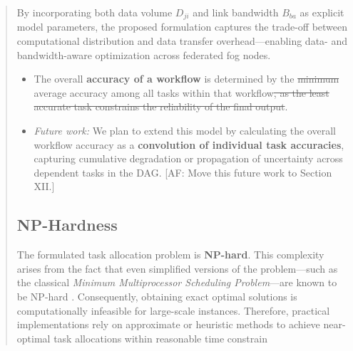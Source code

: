 \documentclass[conference]{IEEEtran}
\newcommand{\anninsert}[2]{{\color{#1}#2}}
\newcommand{\anncomment}[3]{{\color{#1}[#2: #3]}}
\newcommand{\anninsert}[2]{#2}
\newcommand{\anncomment}[3]{}
\newcommand{\AF}[1]{\anncomment{violet}{AF}{#1}}
\newcommand{\af}[1]{\anninsert{violet}{#1}}
\begin{document}
\begin{abstract}
By incorporating both data volume \( D_{ji} \) and link bandwidth \( B_{ba} \) as explicit model parameters, the proposed formulation captures the trade-off between computational distribution and data transfer overhead—enabling data- and bandwidth-aware optimization across federated fog nodes.




\begin{itemize}
    \item The overall \textbf{accuracy of a workflow} is determined by the \af{\sout{minimum} average} accuracy among all tasks within that workflow\af{\sout{, as the least accurate task constrains the reliability of the final output}}.
    \item \textit{Future work:} We plan to extend this model by calculating the overall workflow accuracy as a \textbf{convolution of individual task accuracies}, capturing cumulative degradation or propagation of uncertainty across dependent tasks in the DAG. \AF{Move this future work to Section XII.}
\end{itemize}


\subsection{NP-Hardness}

The formulated task allocation problem is \textbf{NP-hard}. This complexity arises from the fact that even simplified versions of the problem—such as the classical \textit{Minimum Multiprocessor Scheduling Problem}—are known to be NP-hard \cite{lenstra1990approximation}. Consequently, obtaining exact optimal solutions is computationally infeasible for large-scale instances. Therefore, practical implementations rely on approximate or heuristic methods to achieve near-optimal task allocations within reasonable time constrain



\end{abstract}
\end{document}

